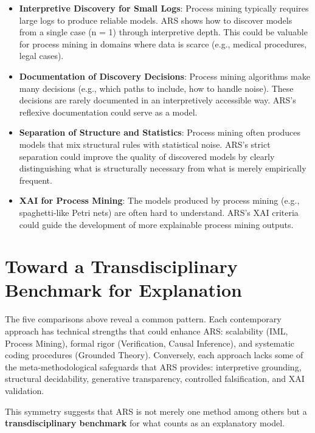 \documentclass[12pt,a4paper]{article}
\begin{document}
\begin{itemize}
    \item \textbf{Interpretive Discovery for Small Logs}: Process mining 
    typically requires large logs to produce reliable models. ARS shows how 
    to discover models from a single case (n = 1) through interpretive 
    depth. This could be valuable for process mining in domains where data 
    is scarce (e.g., medical procedures, legal cases).
    
    \item \textbf{Documentation of Discovery Decisions}: Process mining 
    algorithms make many decisions (e.g., which paths to include, how to 
    handle noise). These decisions are rarely documented in an interpretively 
    accessible way. ARS's reflexive documentation could serve as a model.
    
    \item \textbf{Separation of Structure and Statistics}: Process mining 
    often produces models that mix structural rules with statistical noise. 
    ARS's strict separation could improve the quality of discovered models 
    by clearly distinguishing what is structurally necessary from what is 
    merely empirically frequent.
    
    \item \textbf{XAI for Process Mining}: The models produced by process 
    mining (e.g., spaghetti-like Petri nets) are often hard to understand. 
    ARS's XAI criteria could guide the development of more explainable 
    process mining outputs.
\end{itemize}

\section{Toward a Transdisciplinary Benchmark for Explanation}

The five comparisons above reveal a common pattern. Each contemporary 
approach has technical strengths that could enhance ARS: scalability 
(IML, Process Mining), formal rigor (Verification, Causal Inference), 
and systematic coding procedures (Grounded Theory). Conversely, each 
approach lacks some of the meta-methodological safeguards that ARS 
provides: interpretive grounding, structural decidability, generative 
transparency, controlled falsification, and XAI validation.

This symmetry suggests that ARS is not merely one method among others 
but a \textbf{transdisciplinary benchmark} for what counts as an 
explanatory model.
\end{document}
